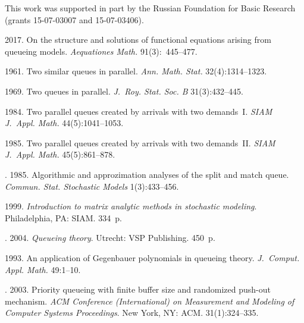 \begin{multicols}{2}
\Ack  
\noindent
This work was supported in part by the
Russian Foundation for Basic Research (grants 15-07-03007 and 15-07-03406).


\renewcommand{\bibname}{\protect\rmfamily References}

\vspace*{-6pt}


{\small\frenchspacing
{\baselineskip=10.65pt
\begin{thebibliography}{99}
 2017. 
On the structure and solutions of functional 
equations arising from queueing models. \textit{Aequationes Math.} 
91(3):~445--477.

 1961. 
Two similar queues in parallel. \textit{Ann. Math. Stat.} 32(4):1314--1323.

 1969. Two queues in parallel. \textit{J.~Roy. 
Stat. Soc. B} 31(3):432--445. 


 1984. Two parallel queues created by 
arrivals with two demands~I. \textit{SIAM J.~Appl. Math.} 44(5):1041--1053.


 1985. 
Two parallel queues created by arrivals with two demands~II. 
\textit{SIAM J.~Appl. Math.} 45(5):861--878.

. 
1985. Algorithmic and approzimation analyses of the split and match queue.
\textit{Commun. Stat. Stochastic Models} 1(3):433--456.

 1999. 
\textit{Introduction to matrix analytic methods in stochastic modeling}. 
Philadelphia, PA: SIAM. 334~p.

. 2004.
\textit{Queueing theory}. Utrecht: VSP Publishing. 450~p.

 1993. 
An application of Gegenbauer polynomials in queueing theory. 
\textit{J.~Comput. Appl. Math.} 49:1--10.


. 
2003. Priority queueing with finite buffer size and randomized push-out mechanism. 
\textit{ACM  Conference (International) on Measurement and Modeling of Computer
Systems Proceedings}. New York, NY: ACM. 31(1):324--335.




\end{thebibliography}}}
\end{multicols}
